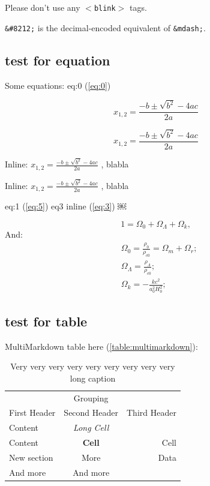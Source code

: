 Please don't use any \texttt{$<$blink$>$} tags.

\texttt{\&\#8212;} is the decimal-encoded equivalent of \texttt{\&mdash;}.

\subsection{test for equation}
\label{testforequation}

Some equations: eq:0 (\autoref{eq:0})

$${x}_{1,2} = \frac{-b\pm \sqrt{{b}^2}-4ac}{2a} \label{eq:0}$$ %

\[{x}_{1,2} = \frac{-b\pm \sqrt{{b}^2}-4ac}{2a} \label{eq:5} \] %

Inline: ${x}_{1,2} = \frac{-b\pm \sqrt{{b}^2}-4ac}{2a}$ , blabla

Inline: ${x}_{1,2} = \frac{-b\pm \sqrt{{b}^2}-4ac}{2a}\label{eq:3}$ , blabla

eq:1 (\autoref{eq:5}) eq3 inline (\autoref{eq:3})
￼ %

\begin{equation}
1=\Omega_0+\Omega_{\Lambda}+\Omega_k, \label{eq:1}
\end{equation}
And:
\begin{eqnarray}
&\Omega_0=\frac{\rho_0}{\rho_{c0}}=\Omega_m+\Omega_r; \\
&\Omega_{\Lambda}=\frac{\rho_{\Lambda}}{\rho_{c0}}; \\
&\Omega_k=-\frac{kc^2}{a_0^2H_0^2}; \label{eq:2}
\end{eqnarray}


\subsection{test for table}
\label{testfortable}

MultiMarkdown table here (\autoref{table:multimarkdown}): 

\begin{table}[htbp]
\begin{minipage}{\linewidth}
\setlength{\tymax}{0.5\linewidth}
\centering
\small
\caption{Very very very very very very very very very long caption}
\label{table:multimarkdown}
\begin{tabulary}{\textwidth}{@{}LCR@{}} \toprule
&Grouping&\\
First Header&Second Header&Third Header\\
\midrule
Content&\emph{Long Cell}&\\
Content&\textbf{Cell}&Cell\\

\midrule
New section&More&Data\\
And more&And more&\\

\bottomrule

\end{tabulary}
\end{minipage}
\end{table}

